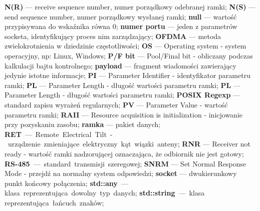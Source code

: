 \textbf{N(R)} --- receive sequence number, numer porządkowy odebranej ramki;\newline
\textbf{N(S)} --- send sequence number, numer porządkowy wysłanej ramki;\newline
\textbf{null} --- wartość przypisywana do wskaźnika równa 0;\newline
\textbf{numer portu} --- jeden z parametrów socketa, identyfikujący proces nim zarządzający;\newline
\textbf{OFDMA} --- metoda zwielokrotnienia w dziedzinie częstotliwości;\newline
\textbf{OS} --- Operating system - system operacyjny, np: Linux, Windows;\newline
\textbf{P/F bit} --- Pool/Final bit - obliczany podczas kalkulacji bajtu kontrolnego;\newline
\textbf{payload} --- fragment wiadomości zawierający jedynie istotne informacje;\newline
\textbf{PI} --- Parameter Identifier - identyfikator parametru ramki;\newline
\textbf{PL} --- Parameter Length - długość wartości parametru ramki;\newline
\textbf{PL} --- Parameter Length - długość wartości parametru ramki;\newline
\textbf{POSIX Regexp} --- standard zapisu wyrażeń regularnych;\newline
\textbf{PV} --- Parameter Value - wartość parametru ramki;\newline
\textbf{RAII} --- Resource acquisition is initialization - inicjowanie przy pozyskaniu zasobu;\newline
\textbf{ramka} --- pakiet danych;\newline
\textbf{RET} --- Remote Electrical Tilt - urządzenie zmieniające elektryczny kąt wiązki anteny;\newline
\textbf{RNR} --- Receiver not ready - wartość ramki nadzorującej oznaczająca, że odbiornik nie jest gotowy;\newline 
\textbf{RS-485} --- standard transmisji szeregowej;\newline
\textbf{SNRM} --- Set Normal Response Mode - przejdź na normalny system odpowiedzi;\newline
\textbf{socket} --- dwukierunkowy punkt końcowy połączenia;\newline
\textbf{std::any} --- klasa reprezentująca dowolny typ danych;\newline
\textbf{std::string} --- klasa reprezentująca łańcuch znaków;\newline
